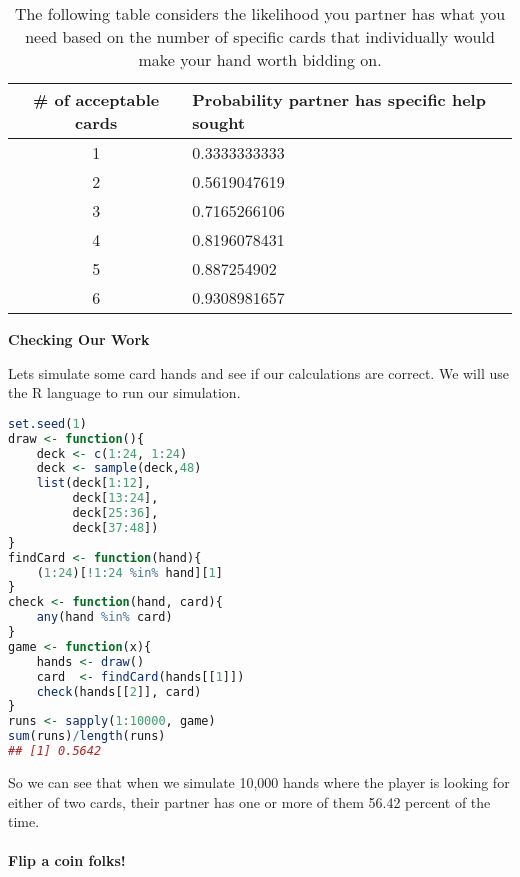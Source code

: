 \documentclass[11pt]{article}
\begin{document}
\begin{table}[]
  \caption{The following table considers the likelihood you partner has what you need based on the number of specific cards that individually would make your hand worth bidding on.}
  \centering
\begin{tabular}{|c|l|}
\hline
\# of acceptable cards & Probability partner has specific help sought \\ \hline
1                      & 0.3333333333 \\ \hline
2                      & 0.5619047619 \\ \hline
3                      & 0.7165266106 \\ \hline
4                      & 0.8196078431 \\ \hline
5                      & 0.887254902  \\ \hline
6                      & 0.9308981657 \\ \hline
\end{tabular}
\end{table}

\begin{center}
  \textbf{Checking Our Work}
\end{center}
Lets simulate some card hands and see if our calculations are correct.
We will use the R language to run our simulation.
\begin{lstlisting}[language=R]
set.seed(1)
draw <- function(){
    deck <- c(1:24, 1:24)
    deck <- sample(deck,48)
    list(deck[1:12],
         deck[13:24],
         deck[25:36],
         deck[37:48])
}
findCard <- function(hand){
    (1:24)[!1:24 %in% hand][1]
}
check <- function(hand, card){
    any(hand %in% card)
}
game <- function(x){
    hands <- draw()
    card  <- findCard(hands[[1]])
    check(hands[[2]], card)
}
runs <- sapply(1:10000, game)
sum(runs)/length(runs)
## [1] 0.5642
\end{lstlisting}
So we can see that when we simulate 10,000 hands where the player is looking for either of two cards, their partner has one or more of them 56.42 percent of the time.\\
\\
\textbf{Flip a coin folks!}
\end{document}
